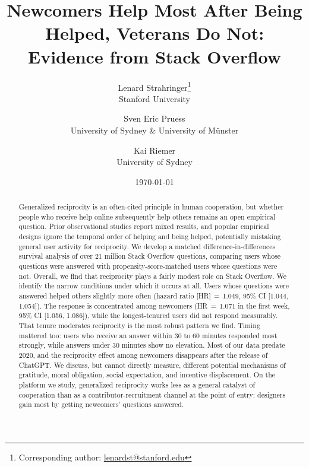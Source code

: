 \documentclass[12pt]{article}
\title{Newcomers Help Most After Being Helped, Veterans Do Not: Evidence from Stack Overflow}
\author{
  Lenard Strahringer\thanks{Corresponding author: \href{mailto:lenardst@stanford.edu}{lenardst@stanford.edu}} \\
  \small Stanford University
  \and
  Sven Eric Pruess \\
  \small University of Sydney \& University of Münster
  \and
  Kai Riemer \\
  \small University of Sydney
}
\date{\today}
\begin{document}

{\singlespacing
\maketitle
\thispagestyle{empty}

\begin{abstract}
\noindent Generalized reciprocity is an often-cited principle in human cooperation, but whether people who receive help online subsequently help others remains an open empirical question. Prior observational studies report mixed results, and popular empirical designs ignore the temporal order of helping and being helped, potentially mistaking general user activity for reciprocity. We develop a matched difference-in-differences survival analysis of over 21 million Stack Overflow questions, comparing users whose questions were answered with propensity-score-matched users whose questions were not. Overall, we find that reciprocity plays a fairly modest role on Stack Overflow. We identify the narrow conditions under which it occurs at all. Users whose questions were answered helped others slightly more often (hazard ratio [HR]\,$=$\,1.049, 95\% CI [1.044, 1.054]). The response is concentrated among newcomers (HR\,$=$\,1.071 in the first week, 95\% CI [1.056, 1.086]), while the longest-tenured users did not respond measurably. That tenure moderates reciprocity is the most robust pattern we find. Timing mattered too: users who receive an answer within 30 to 60 minutes responded most strongly, while answers under 30 minutes show no elevation. Most of our data predate 2020, and the reciprocity effect among newcomers disappears after the release of ChatGPT. We discuss, but cannot directly measure, different potential mechanisms of gratitude, moral obligation, social expectation, and incentive displacement. On the platform we study, generalized reciprocity works less as a general catalyst of cooperation than as a contributor-recruitment channel at the point of entry: designers gain most by getting newcomers' questions answered.
\end{abstract}
}%

\newpage



\medskip


\newpage
\appendix

\end{document}
